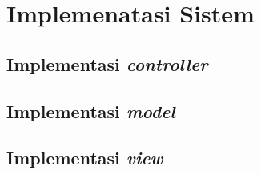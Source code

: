 \section{Implemenatasi Sistem}
\subsection{Implementasi \emph{controller}}
\subsection{Implementasi \emph{model}}
\subsection{Implementasi \emph{view}}